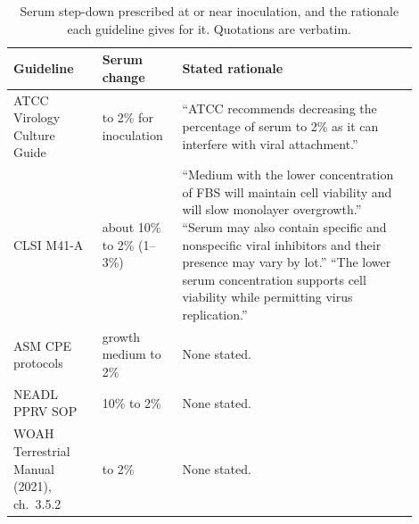 \begin{table}[!ht]
\centering
\caption{Serum step-down prescribed at or near inoculation, and the rationale each guideline gives for it. Quotations are verbatim.}
\label{tab:rationale}
\begin{tabular}{p{0.2\linewidth}p{0.17\linewidth}p{0.53\linewidth}}
\hline
Guideline & Serum change & Stated rationale \\
\hline
ATCC Virology Culture Guide & to 2\% for inoculation & ``ATCC recommends decreasing the percentage of serum to 2\% as it can interfere with viral attachment.'' \\
CLSI M41-A & about 10\% to 2\% (1--3\%) & ``Medium with the lower concentration of FBS will maintain cell viability and will slow monolayer overgrowth.'' ``Serum may also contain specific and nonspecific viral inhibitors and their presence may vary by lot.'' ``The lower serum concentration supports cell viability while permitting virus replication.'' \\
ASM CPE protocols & growth medium to 2\% & None stated. \\
NEADL PPRV SOP & 10\% to 2\% & None stated. \\
WOAH Terrestrial Manual (2021), ch.\ 3.5.2 & to 2\% & None stated. \\
\hline
\end{tabular}
\end{table}
